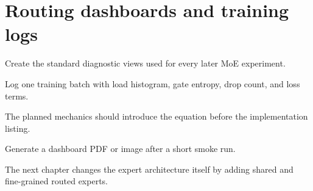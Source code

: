\section{Routing dashboards and training logs}
\label{sec:ch07-routing-dashboards-and-training-logs}

Create the standard diagnostic views used for every later MoE experiment.



Log one training batch with load histogram, gate entropy, drop count, and loss terms.



The planned mechanics should introduce the equation before the implementation listing.





\begin{checkpointbox}
Generate a dashboard PDF or image after a short smoke run.
\end{checkpointbox}

The next chapter changes the expert architecture itself by adding shared and fine-grained routed experts.
